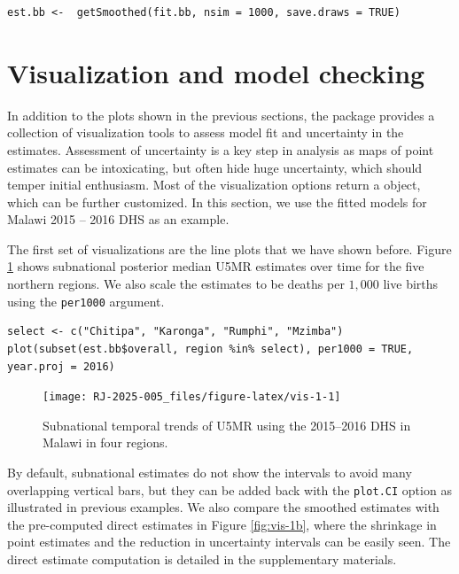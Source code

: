 \begin{verbatim}
est.bb <-  getSmoothed(fit.bb, nsim = 1000, save.draws = TRUE) 
\end{verbatim}

\section{Visualization and model checking}\label{visualization-and-model-checking}

In addition to the plots shown in the previous sections, the  package provides a collection of visualization tools to assess model fit and uncertainty in the estimates. Assessment of uncertainty is a key step in analysis as maps of point estimates can be intoxicating, but often hide huge uncertainty, which should temper initial enthusiasm. Most of the visualization options return a  object, which can be further customized. In this section, we use the fitted models for Malawi 2015 -- 2016 DHS as an example.

The first set of visualizations are the line plots that we have shown before. Figure \ref{fig:vis-1} shows subnational posterior median U5MR estimates over time for the five northern regions. We also scale the estimates to be deaths per \(1,000\) live births using the \texttt{per1000} argument.

\begin{verbatim}
select <- c("Chitipa", "Karonga", "Rumphi", "Mzimba")
plot(subset(est.bb$overall, region %in% select), per1000 = TRUE, year.proj = 2016)
\end{verbatim}

\begin{figure}[!ht]

{\centering \texttt{[image: RJ-2025-005\_files/figure-latex/vis-1-1]} 

}

\caption{Subnational temporal trends of U5MR using the 2015--2016 DHS in Malawi in four regions.}\label{fig:vis-1}
\end{figure}

By default, subnational estimates do not show the intervals to avoid many overlapping vertical bars, but they can be added back with the \texttt{plot.CI} option as illustrated in previous examples. We also compare the smoothed estimates with the pre-computed direct estimates in Figure \ref{fig:vis-1b}, where the shrinkage in point estimates and the reduction in uncertainty intervals can be easily seen. The direct estimate computation is detailed in the supplementary materials.


